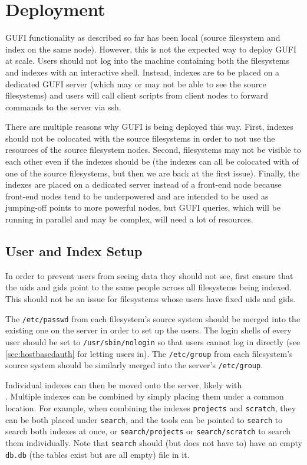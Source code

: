 \section{Deployment}
\label{sec:deploy}
GUFI functionality as described so far has been local (source
filesystem and index on the same node). However, this is not the
expected way to deploy GUFI at scale. Users should not log into the
machine containing both the filesystems and indexes with an
interactive shell. Instead, indexes are to be placed on a dedicated
GUFI server (which may or may not be able to see the source
filesystems) and users will call client scripts from client nodes to
forward commands to the server via ssh.

There are multiple reasons why GUFI is being deployed this way. First,
indexes should not be colocated with the source filesystems in order
to not use the resources of the source filesystem nodes. Second,
filesystems may not be visible to each other even if the indexes
should be (the indexes can all be colocated with of one of the source
filesystems, but then we are back at the first issue). Finally, the
indexes are placed on a dedicated server instead of a front-end node
because front-end nodes tend to be underpowered and are intended to be
used as jumping-off points to more powerful nodes, but GUFI queries,
which will be running in parallel and may be complex, will need a lot
of resources.

\subsection{User and Index Setup}
In order to prevent users from seeing data they should not see, first
ensure that the uids and gids point to the same people across all
filesystems being indexed. This should not be an issue for filesystems
whose users have fixed uids and gids.

The \texttt{/etc/passwd} from each filesystem's source system should
be merged into the existing one on the server in order to set up
the users. The login shells of every user should be set to
\texttt{/usr/sbin/nologin} so that users cannot log in directly (see
\ref{sec:hostbasedauth} for letting users in). The \texttt{/etc/group}
from each filesystem's source system should be similarly merged into
the server's \texttt{/etc/group}.

Individual indexes can then be moved onto the server, likely with
\\\gufitraceindex. Multiple indexes can be combined by simply placing
them under a common location. For example, when combining the indexes
\texttt{projects} and \texttt{scratch}, they can be both placed under
\texttt{search}, and the tools can be pointed to \texttt{search} to
search both indexes at once, or \texttt{search/projects} or
\texttt{search/scratch} to search them individually. Note that
\texttt{search} should (but does not have to) have an empty
\texttt{db.db} (the tables exist but are all empty) file in it.

